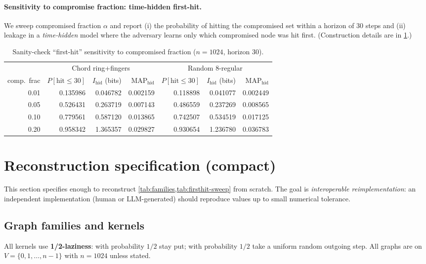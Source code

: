 \documentclass[11pt]{article}
\begin{document}
\paragraph{Sensitivity to compromise fraction: time-hidden first-hit.}
We sweep compromised fraction $\alpha$ and report (i) the probability of hitting
the compromised set within a horizon of 30 steps and (ii) leakage in a
\emph{time-hidden} model where the adversary learns only which compromised node
was hit first. (Construction details are in \cref{sec:reconstruct}.)

\begin{table}[h]
\centering
\small
\setlength{\tabcolsep}{3.5pt}
\begin{tabular}{r|rrr|rrr}
\toprule
 & \multicolumn{3}{c|}{Chord ring+fingers} & \multicolumn{3}{c}{Random 8-regular} \\
comp.\ frac & $P[\mathrm{hit}\le 30]$ & $I_{\mathrm{hid}}$ (bits) & MAP$_{\mathrm{hid}}$ &
$P[\mathrm{hit}\le 30]$ & $I_{\mathrm{hid}}$ (bits) & MAP$_{\mathrm{hid}}$ \\
\midrule
0.01 & 0.135986 & 0.046782 & 0.002159 & 0.118898 & 0.041077 & 0.002449 \\
0.05 & 0.526431 & 0.263719 & 0.007143 & 0.486559 & 0.237269 & 0.008565 \\
0.10 & 0.779561 & 0.587120 & 0.013865 & 0.742507 & 0.534519 & 0.017125 \\
0.20 & 0.958342 & 1.365357 & 0.029827 & 0.930654 & 1.236780 & 0.036783 \\
\bottomrule
\end{tabular}
\caption{Sanity-check ``first-hit'' sensitivity to compromised fraction ($n=1024$, horizon 30).}
\label{tab:firsthit-sweep}
\end{table}

\section{Reconstruction specification (compact)}\label{sec:reconstruct}
This section specifies enough to reconstruct \cref{tab:families,tab:firsthit-sweep}
from scratch. The goal is \emph{interoperable reimplementation}: an independent
implementation (human or LLM-generated) should reproduce values up to small
numerical tolerance.

\subsection{Graph families and kernels}
All kernels use \textbf{1/2-laziness}: with probability $1/2$ stay put; with
probability $1/2$ take a uniform random outgoing step.
All graphs are on $V=\{0,1,\dots,n-1\}$ with $n=1024$ unless stated.
\end{document}

